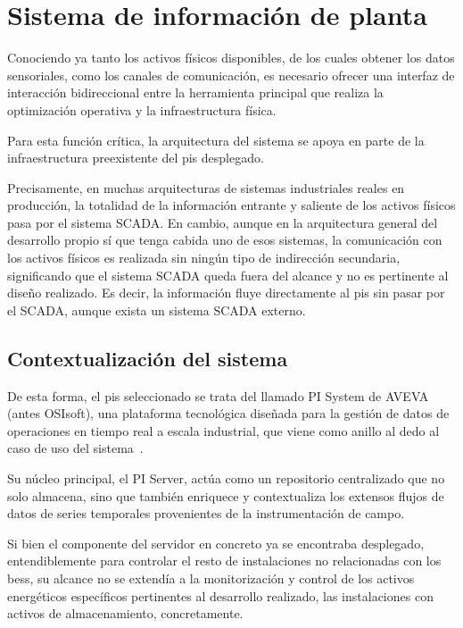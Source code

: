 \section{Sistema de información de planta}
\label{makereference3.4}

Conociendo ya tanto los activos físicos disponibles, de los cuales obtener los datos sensoriales, como los canales de comunicación, es necesario ofrecer una interfaz de interacción bidireccional entre la herramienta principal que realiza la optimización operativa y la infraestructura física.

Para esta función crítica, la arquitectura del sistema se apoya en parte de la infraestructura preexistente del \gls{pis} desplegado.

Precisamente, en muchas arquitecturas de sistemas industriales reales en producción, la totalidad de la información entrante y saliente de los activos físicos pasa por el sistema SCADA\@. En cambio, aunque en la arquitectura general del desarrollo propio sí que tenga cabida uno de esos sistemas, la comunicación con los activos físicos es realizada sin ningún tipo de indirección secundaria, significando que el sistema SCADA queda fuera del alcance y no es pertinente al diseño realizado. Es decir, la información fluye directamente al \gls{pis} sin pasar por el SCADA\@, aunque exista un sistema SCADA externo.

\subsection{Contextualización del sistema}
\label{makereference3.4.1}

De esta forma, el \gls{pis} seleccionado se trata del llamado PI System de AVEVA (antes OSIsoft), una plataforma tecnológica diseñada para la gestión de datos de operaciones en tiempo real a escala industrial, que viene como anillo al dedo al caso de uso del sistema~\cite{aveva2025aveva}.

Su núcleo principal, el PI Server, actúa como un repositorio centralizado que no solo almacena, sino que también enriquece y contextualiza los extensos flujos de datos de series temporales provenientes de la instrumentación de campo.

Si bien el componente del servidor en concreto ya se encontraba desplegado, entendiblemente para controlar el resto de instalaciones no relacionadas con los \gls{bess}, su alcance no se extendía a la monitorización y control de los activos energéticos específicos pertinentes al desarrollo realizado, las instalaciones con activos de almacenamiento, concretamente.

